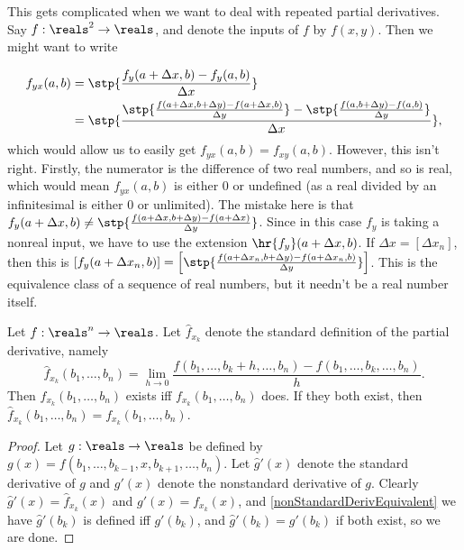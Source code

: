 This gets complicated when we want to deal with repeated partial derivatives. Say $f: \reals^2 \to \reals$, and denote the inputs of $f$ by $f(x, y)$. Then we might want to write

\begin{align*}
    f_{yx}(a, b) &= \stp{\frac{f_y(a + \Delta x, b) - f_y(a, b)}{\Delta x}} \\
        &= \stp{\frac{\stp{\frac{f(a + \Delta x, b + \Delta y) - f(a + \Delta x, b)}{\Delta y}} - \stp{\frac{f(a, b + \Delta y) - f(a, b)}{\Delta y}}}{\Delta x}},
\end{align*}
which would allow us to easily get $f_{yx}(a, b)= f_{xy}(a, b)$. However, this isn't right. Firstly, the numerator is the difference of two real numbers, and so is real, which would mean $f_{yx}(a, b)$ is either $0$ or undefined (as a real divided by an infinitesimal is either $0$ or unlimited). The mistake here is that $f_y(a + \Delta x, b) \neq \stp{\frac{f(a + \Delta x, b + \Delta y) - f(a + \Delta x)}{\Delta y}}$. Since in this case $f_y$ is taking a nonreal input, we have to use the extension $\hr{f_y}(a + \Delta x, b)$. If $\Delta x = [\Delta x_n]$, then this is $[f_y(a + \Delta x_n, b)] = \left[\stp{\frac{f(a + \Delta x_n, b + \Delta y) - f(a + \Delta x_n, b)}{\Delta y}}\right]$. This is the equivalence class of a sequence of real numbers, but it needn't be a real number itself.

\begin{thm}
    Let $f: \reals^n \to \reals$. Let $\hat{f}_{x_k}$ denote the standard definition of the partial derivative, namely
    \[ \hat{f}_{x_k}(b_1, \ldots, b_n) = \lim_{h \to 0} \frac{f(b_1, \ldots, b_k + h, \ldots, b_n) - f(b_1, \ldots, b_k, \ldots, b_n)}{h} .\]
    Then $\hat{f}_{x_k}(b_1, \ldots, b_n)$ exists iff $f_{x_k}(b_1, \ldots, b_n)$ does. If they both exist, then $\hat{f}_{x_k}(b_1, \ldots, b_n) = f_{x_k}(b_1, \ldots, b_n)$.
\end{thm}

\begin{proof}
    Let $g: \reals \to \reals$ be defined by $g(x) = f(b_1, \ldots, b_{k-1}, x, b_{k+1}, \ldots, b_n)$. Let $\hat{g}'(x)$ denote the standard derivative of $g$ and $g'(x)$ denote the nonstandard derivative of $g$. Clearly $\hat{g}'(x) = \hat{f}_{x_k}(x)$ and $g'(x) = f_{x_k}(x)$, and \autoref{nonStandardDerivEquivalent} we have $\hat{g}'(b_k)$ is defined iff $g'(b_k)$, and $\hat{g}'(b_k) = g'(b_k)$ if both exist, so we are done.
\end{proof}

